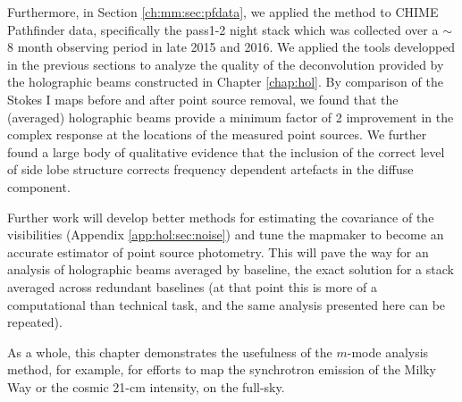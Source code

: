 Furthermore, in Section \ref{ch:mm:sec:pfdata}, we applied the method to CHIME Pathfinder data, specifically the pass1-2 night stack which was collected over a $\sim$8 month observing period in late 2015 and 2016. We applied the tools developped in the previous sections to analyze the quality of the deconvolution provided by the holographic beams constructed in Chapter \ref{chap:hol}. By comparison of the Stokes I maps before and after point source removal, we found that the (averaged) holographic beams provide a minimum factor of 2 improvement in the complex response at the locations of the measured point sources. We further found a large body of qualitative evidence that the inclusion of the correct level of side lobe structure corrects frequency dependent artefacts in the diffuse component.

Further work will develop better methods for estimating the covariance of the visibilities (Appendix \ref{app:hol:sec:noise}) and tune the mapmaker to become an accurate estimator of point source photometry. This will pave the way for an analysis of holographic beams averaged by baseline, the exact solution for a stack averaged across redundant baselines (at that point this is more of a computational than technical task, and the same analysis presented here can be repeated).

As a whole, this chapter demonstrates the usefulness of the $m$-mode analysis method, for example, for efforts to map the synchrotron emission of the Milky Way \cite{eastwoodetal} or the cosmic 21-cm intensity, on the full-sky.